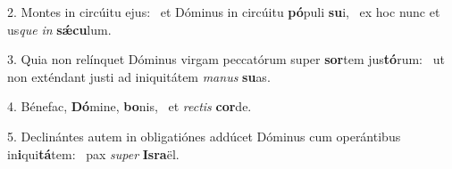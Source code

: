 2. Montes in circúitu ejus: \dag\  et Dóminus in circúitu \textbf{pó}puli \textbf{su}i, \ast\  ex hoc nunc et us\textit{que} \textit{in} \textbf{sǽ}\textbf{cu}lum.\

3. Quia non relínquet Dóminus virgam peccatórum super \textbf{sor}tem jus\textbf{tó}rum: \ast\  ut non exténdant justi ad iniquitátem \textit{ma}\textit{nus} \textbf{su}as.\

4. Bénefac, \textbf{Dó}mine, \textbf{bo}nis, \ast\  et \textit{rec}\textit{tis} \textbf{cor}de.\

5. Declinántes autem in obligatiónes addúcet Dóminus cum operántibus in\textbf{i}qui\textbf{tá}tem: \ast\  pax \textit{su}\textit{per} \textbf{Is}\textbf{ra}ël.\

